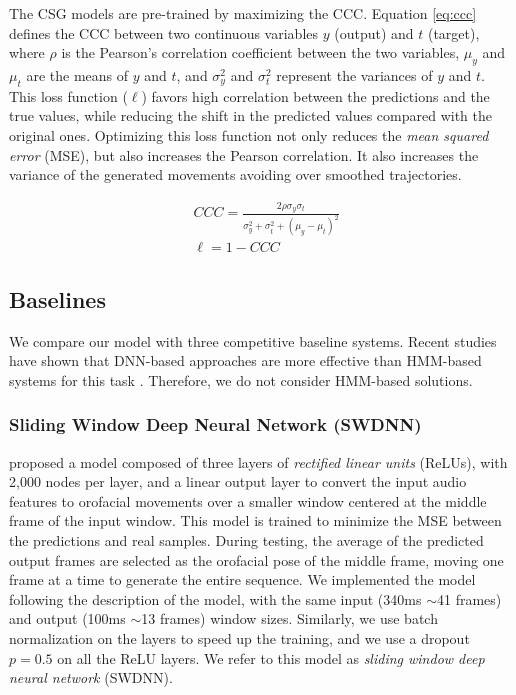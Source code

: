 \documentclass[10pt,journal,compsoc]{IEEEtran}
\begin{document}
The CSG models are pre-trained by maximizing the CCC. Equation \ref{eq:ccc} defines the CCC between two continuous variables $y$ (output)  and $t$ (target), where $\rho$ is the Pearson's  correlation coefficient between the two variables, $\mu_y$ and $\mu_t$ are the means of $y$ and $t$, and $\sigma_y^2$ and $\sigma_t^2$ represent the variances of $y$ and $t$. This loss function ($\ell$) favors high correlation between the predictions and the true values, while reducing the shift in the predicted values compared with the original ones. Optimizing this loss function not only reduces the \emph{mean squared error} (MSE), but also increases the Pearson correlation. It also increases the variance of the generated movements avoiding over smoothed trajectories.


\begin{equation}
\begin{split}
&CCC = \frac{2\rho\sigma_y\sigma_t}{\sigma_y^2+\sigma_t^2+(\mu_y-\mu_t)^2}\\
&\ell = 1-CCC
\end{split}
\label{eq:ccc}
\end{equation}

\subsection{Baselines}
\label{ssec:baseline}

We compare our model with three competitive baseline systems. Recent studies have shown that DNN-based approaches are more effective than HMM-based systems for this task \cite{Taylor_2016, Fan_2016,Parker_2017}. Therefore, we do not consider HMM-based solutions. 

\subsubsection{Sliding Window Deep Neural Network (SWDNN)}
\label{sssec:Baseswdnn}
\citet{Taylor_2016} proposed a model composed of three layers of \emph{rectified linear units} (ReLUs), with 2,000 nodes per layer, and a linear output layer to convert the input audio features  to orofacial movements over a smaller window centered at the middle frame of the input window. This model is trained to minimize the MSE between the predictions and real samples. During testing, the average of the predicted output frames are selected as the orofacial pose of the middle frame, moving one frame at a time to generate the entire sequence. We implemented the model following the description of the model, with the same input (340ms $\sim$41 frames) and output (100ms $\sim$13 frames) window sizes. Similarly, we use batch normalization on the layers to speed up the training, and we use a dropout $p=0.5$ on all the ReLU layers. We refer to this model as \emph{sliding window deep neural network} (SWDNN). 
\end{document}
